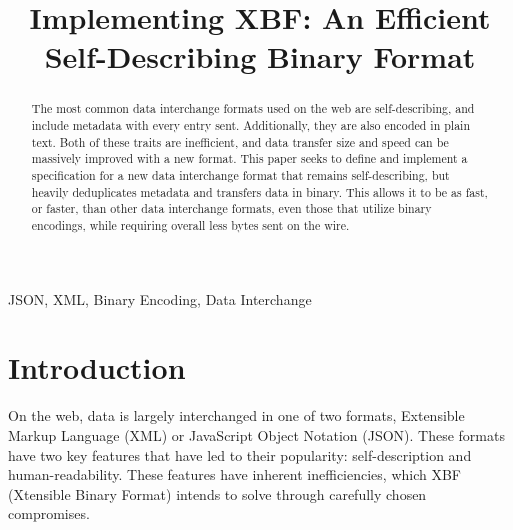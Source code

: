 \documentclass[conference]{IEEEtran}
\begin{document}
\title{Implementing XBF: An Efficient Self-Describing Binary Format}

\author{
	\and
}

\maketitle

\begin{abstract}
	The most common data interchange formats used on the web are self-describing, and include metadata with every entry sent. Additionally, they are also encoded in plain text. Both of these traits are inefficient, and data transfer size and speed can be massively improved with a new format. This paper seeks to define and implement a specification for a new data interchange format that remains self-describing, but heavily deduplicates metadata and transfers data in binary. This allows it to be as fast, or faster, than other data interchange formats, even those that utilize binary encodings, while requiring overall less bytes sent on the wire.
\end{abstract}

\begin{IEEEkeywords}
	JSON, XML, Binary Encoding, Data Interchange
\end{IEEEkeywords}

\section{Introduction}

On the web, data is largely interchanged in one of two formats, Extensible Markup Language (XML)\cite{xml_spec} or  JavaScript Object Notation (JSON)\cite{json_spec}. These formats have two key features that have led to their popularity: self-description and human-readability. These features have inherent inefficiencies, which XBF (Xtensible Binary Format) intends to solve through carefully chosen compromises.
\end{document}
